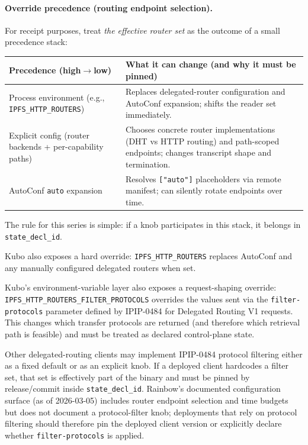 \documentclass[11pt]{article}
\begin{document}
\paragraph{Override precedence (routing endpoint selection).}
For receipt purposes, treat \emph{the effective router set} as the outcome of a small precedence stack:
\begin{center}
\small
\begin{tabularx}{0.98\linewidth}{@{}lX@{}}
\toprule
Precedence (high$\to$low) & What it can change (and why it must be pinned) \\
\midrule
Process environment (e.g., \texttt{IPFS\_HTTP\_ROUTERS}) & Replaces delegated-router configuration and AutoConf expansion; shifts the reader set immediately.\\
Explicit config (router backends + per-capability paths) & Chooses concrete router implementations (DHT vs HTTP routing) and path-scoped endpoints; changes transcript shape and termination.\\
AutoConf \texttt{auto} expansion & Resolves \texttt{["auto"]} placeholders via remote manifest; can silently rotate endpoints over time.\\
\bottomrule
\end{tabularx}
\end{center}
The rule for this series is simple: if a knob participates in this stack, it belongs in \texttt{state\_decl\_id}.\cite{series:planstateequiv,series:receiptitems}


Kubo also exposes a hard override: \texttt{IPFS\_HTTP\_ROUTERS} replaces AutoConf and any manually configured delegated routers when set.\cite{kuboEnvVars}

Kubo's environment-variable layer also exposes a request-shaping override: \texttt{IPFS\_HTTP\_ROUTERS\_\allowbreak FILTER\_\allowbreak PROTOCOLS} overrides the values sent via the \texttt{filter-protocols} parameter defined by IPIP-0484 for Delegated Routing V1 requests. This changes which transfer protocols are returned (and therefore which retrieval path is feasible) and must be treated as declared control-plane state.
\cite{kuboEnvVars,ipip0484,ipfsDelegatedRoutingV1Spec}

Other delegated-routing clients may implement IPIP-0484 protocol filtering either as a fixed default or as an explicit knob.
If a deployed client hardcodes a filter set, that set is effectively part of the binary and must be pinned by release/commit inside \texttt{state\_decl\_id}.
Rainbow's documented configuration surface (as of 2026-03-05) includes router endpoint selection and time budgets but does not document a protocol-filter knob; deployments that rely on protocol filtering should therefore pin the deployed client version or explicitly declare whether \texttt{filter-protocols} is applied.
\cite{rainbowEnvVars,ipip0484}
\end{document}
